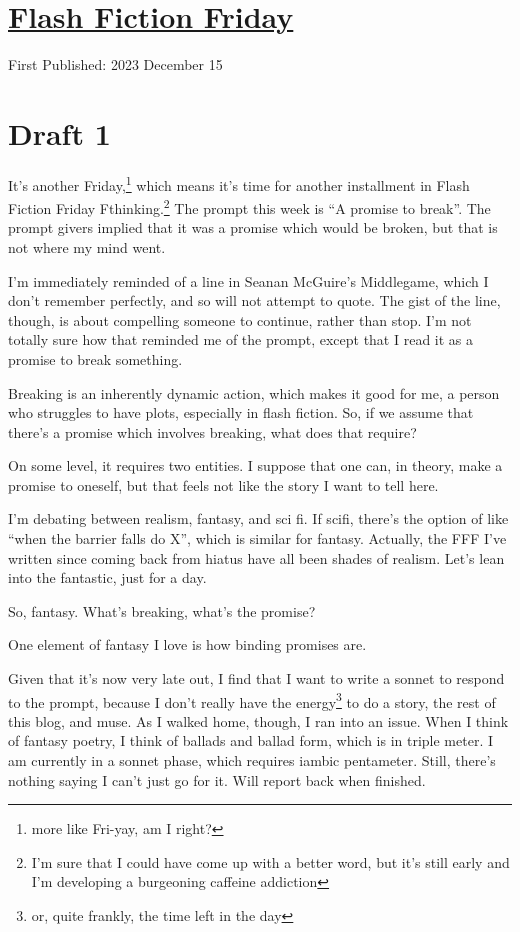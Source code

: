 \documentclass[12pt]{article}[titlepage]
\newcommand{\say}[1]{``#1''}
\newcommand{\1}{\={a}}
\newcommand{\2}{\={e}}
\newcommand{\3}{\={\i}}
\newcommand{\4}{\=o}
\newcommand{\5}{\=u}
\newcommand{\6}{\={A}}
\renewcommand{\,}{\textsuperscript{,}}
\begin{document}
\doublespacing
\section{\href{flash-fiction-231.html}{Flash Fiction Friday}}
First Published: 2023 December 15

\section{Draft 1}
It's another Friday,\footnote{more like Fri-yay, am I right?} which means it's time for another installment in Flash Fiction Friday Fthinking.\footnote{I'm sure that I could have come up with a better word, but it's still early and I'm developing a burgeoning caffeine addiction}
The prompt this week is \say{A promise to break}.
The prompt givers implied that it was a promise which would be broken, but that is not where my mind went.

I'm immediately reminded of a line in Seanan McGuire's Middlegame, which I don't remember perfectly, and so will not attempt to quote.
The gist of the line, though, is about compelling someone to continue, rather than stop.
I'm not totally sure how that reminded me of the prompt, except that I read it as a promise to break something.

Breaking is an inherently dynamic action, which makes it good for me, a person who struggles to have plots, especially in flash fiction.
So, if we assume that there's a promise which involves breaking, what does that require?

On some level, it requires two entities.
I suppose that one can, in theory, make a promise to oneself, but that feels not like the story I want to tell here.

I'm debating between realism, fantasy, and sci fi.
If scifi, there's the option of like \say{when the barrier falls do X}, which is similar for fantasy.
Actually, the FFF I've written since coming back from hiatus have all been shades of realism.
Let's lean into the fantastic, just for a day.

So, fantasy.
What's breaking, what's the promise?

One element of fantasy I love is how binding promises are.

Given that it's now very late out, I find that I want to write a sonnet to respond to the prompt, because I don't really have the energy\footnote{or, quite frankly, the time left in the day} to do a story, the rest of this blog, and muse.
As I walked home, though, I ran into an issue.
When I think of fantasy poetry, I think of ballads and ballad form, which is in triple meter.
I am currently in a sonnet phase, which requires iambic pentameter.
Still, there's nothing saying I can't just go for it.
Will report back when finished.
\end{document}
